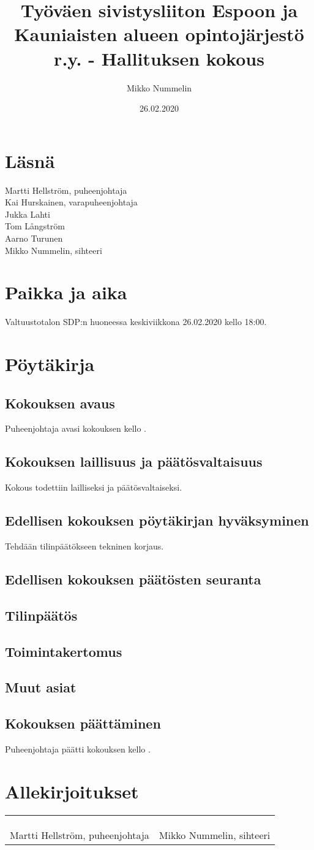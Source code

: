 \documentclass[a4paper]{amsart}
\title{Työväen sivistysliiton Espoon ja Kauniaisten alueen opintojärjestö r.y. - Hallituksen kokous}
\author{Mikko Nummelin}
\date{26.02.2020}
\begin{document}
\maketitle
\tableofcontents
\section*{Läsnä}
\begin{flushleft}
Martti Hellström, puheenjohtaja \\
Kai Hurskainen, varapuheenjohtaja \\
Jukka Lahti \\
Tom Långström \\
Aarno Turunen \\
Mikko Nummelin, sihteeri
\end{flushleft}
\section*{Paikka ja aika}
Valtuustotalon SDP:n huoneessa keskiviikkona 26.02.2020 kello 18:00.
\section{Pöytäkirja}
\subsection{Kokouksen avaus}
Puheenjohtaja avasi kokouksen kello .
\subsection{Kokouksen laillisuus ja päätösvaltaisuus}
Kokous todettiin lailliseksi ja päätösvaltaiseksi.
\subsection{Edellisen kokouksen pöytäkirjan hyväksyminen}
Tehdään tilinpäätökseen tekninen korjaus.
\subsection{Edellisen kokouksen päätösten seuranta}
\subsection{Tilinpäätös}
\subsection{Toimintakertomus}
\subsection{Muut asiat}
\subsection{Kokouksen päättäminen}
Puheenjohtaja päätti kokouksen kello .
\section*{Allekirjoitukset}
\begin{flushleft}
\begin{tabular}{ll}
& \\
& \\
& \\
Martti Hellström, puheenjohtaja &
Mikko Nummelin, sihteeri 
\end{tabular}
\end{flushleft}
\end{document}
